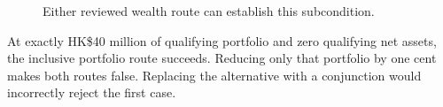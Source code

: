 \begin{figure}[H]
\centering
{}
\caption{Either reviewed wealth route can establish this subcondition.}\label{fig:teach-P-01b-complete-dry-run-04}
\end{figure}

At exactly HK\$40 million of qualifying portfolio and zero qualifying net assets, the inclusive portfolio route succeeds. Reducing only that portfolio by one cent makes both routes false. Replacing the alternative with a conjunction would incorrectly reject the first case.

